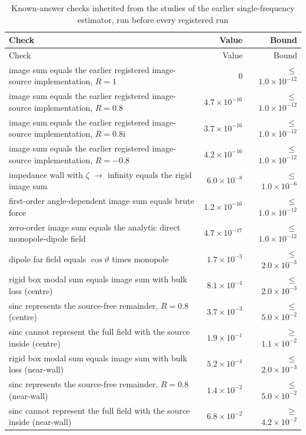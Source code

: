 \begin{longtable}{@{}p{13.2cm}rr@{}}
\caption{Known-answer checks inherited from the studies of the earlier single-frequency estimator, run before every registered run}\label{tab:s-ka}\\
\toprule
Check & Value & Bound\\
\midrule\endfirsthead
\toprule
Check & Value & Bound\\
\midrule\endhead
image sum equals the earlier registered image-source implementation, $R=1$ & 0 & $\le$ $1.0\times10^{-12}$\\
image sum equals the earlier registered image-source implementation, $R=0.8$ & $4.7\times10^{-16}$ & $\le$ $1.0\times10^{-12}$\\
image sum equals the earlier registered image-source implementation, $R=0.8\mathrm{i}$ & $3.7\times10^{-16}$ & $\le$ $1.0\times10^{-12}$\\
image sum equals the earlier registered image-source implementation, $R=-0.8$ & $4.2\times10^{-16}$ & $\le$ $1.0\times10^{-12}$\\
impedance wall with $\zeta$ $\to$ infinity equals the rigid image sum & $6.0\times10^{-8}$ & $\le$ $1.0\times10^{-6}$\\
first-order angle-dependent image sum equals brute force & $1.2\times10^{-16}$ & $\le$ $1.0\times10^{-12}$\\
zero-order image sum equals the analytic direct monopole-dipole field & $4.7\times10^{-17}$ & $\le$ $1.0\times10^{-12}$\\
dipole far field equals $\cos\vartheta$ times monopole & $1.7\times10^{-3}$ & $\le$ $2.0\times10^{-3}$\\
rigid box modal sum equals image sum with bulk loss (centre) & $8.1\times10^{-4}$ & $\le$ $2.0\times10^{-3}$\\
sinc represents the source-free remainder, $R=0.8$ (centre) & $3.7\times10^{-3}$ & $\le$ $5.0\times10^{-2}$\\
sinc cannot represent the full field with the source inside (centre) & $1.9\times10^{-1}$ & $\ge$ $1.1\times10^{-2}$\\
rigid box modal sum equals image sum with bulk loss (near-wall) & $5.2\times10^{-4}$ & $\le$ $2.0\times10^{-3}$\\
sinc represents the source-free remainder, $R=0.8$ (near-wall) & $1.4\times10^{-2}$ & $\le$ $5.0\times10^{-2}$\\
sinc cannot represent the full field with the source inside (near-wall) & $6.8\times10^{-2}$ & $\ge$ $4.2\times10^{-2}$\\

\end{longtable}
